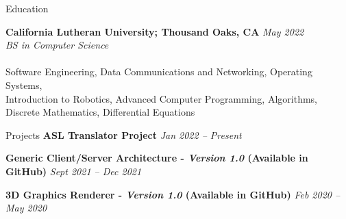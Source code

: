\documentclass[10.5pt]{resume} %
\begin{document}

\begin{rSection}{Education}

{\bf California Lutheran University; Thousand Oaks, CA} \hfill {\em May 2022}
\\{ \textit {BS in Computer Science}}
\vspace*{1 mm}
\\{}
\\{} Software Engineering, Data Communications and Networking, Operating Systems,
\\Introduction to Robotics, Advanced Computer Programming, Algorithms, Discrete Mathematics, Differential Equations
\end{rSection}

\begin{rSection}{Projects}
{\bf ASL Translator Project} \hfill {\em Jan 2022 – Present} 
\\

{\bf Generic Client/Server Architecture - \textit{Version 1.0} (Available in GitHub)} \hfill {\em Sept 2021 – Dec 2021} 
\\

{\bf 3D Graphics Renderer - \textit {Version 1.0} (Available in GitHub)} \hfill {\em Feb 2020 – May 2020} 
\\

\end{rSection}
\end{document}
